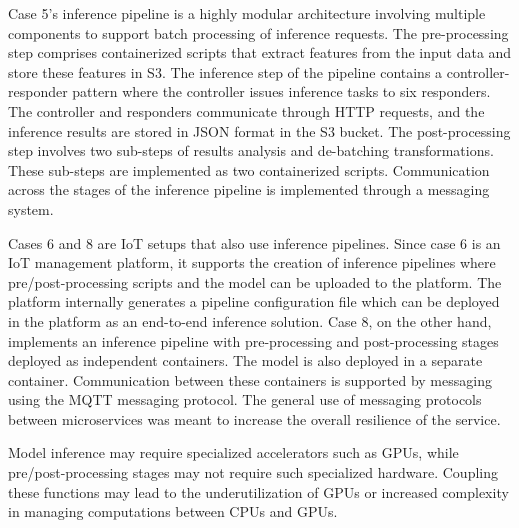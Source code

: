 Case 5's inference pipeline is a highly modular architecture involving multiple components to support batch processing of inference requests. The pre-processing step comprises containerized scripts that extract features from the input data and store these features in S3. The inference step of the pipeline contains a controller-responder pattern where the controller issues inference tasks to six responders. The controller and responders communicate through HTTP requests, and the inference results are stored in JSON format in the S3 bucket. The post-processing step involves two sub-steps of results analysis and de-batching transformations. These sub-steps are implemented as two containerized scripts. Communication across the stages of the inference pipeline is implemented through a messaging system.

Cases 6 and 8 are IoT setups that also use inference pipelines. Since case 6 is an IoT management platform, it supports the creation of inference pipelines where pre/post-processing scripts and the model can be uploaded to the platform. The platform internally generates a pipeline configuration file which can be deployed in the platform as an end-to-end inference solution. Case 8, on the other hand, implements an inference pipeline with pre-processing and post-processing stages deployed as independent containers. The model is also deployed in a separate container. Communication between these containers is supported by messaging using the MQTT messaging protocol. The general use of messaging protocols between microservices was meant to increase the overall resilience of the service.

Model inference may require specialized accelerators such as GPUs, while pre/post-processing stages may not require such specialized hardware. Coupling these functions may lead to the underutilization of GPUs or increased complexity in managing computations between CPUs and GPUs.




